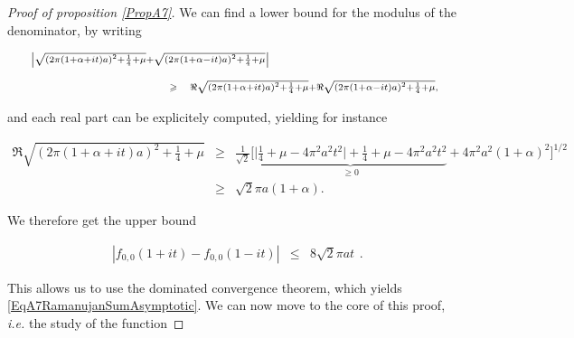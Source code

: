 \documentclass{jams-l}
\theoremstyle{definition}
\theoremstyle{remark}
\numberwithin{equation}{section}
\begin{document}
\begin{proof}[Proof of proposition \ref{PropA7}]
                \noindent We can find a lower bound for the modulus of the denominator, by writing
                
                \[ \begin{array}{lll}
                        \multicolumn{3}{l}{\scriptstyle \left \vert \sqrt{\left( 2 \pi \left( 1 + \alpha + it \right) a \right)^2 + \frac{1}{4} + \mu} + \sqrt{\left( 2 \pi \left( 1 + \alpha - it \right) a \right)^2 + \frac{1}{4} + \mu} \right \vert} \\[1em]
                        
                        \qquad \qquad \qquad \qquad \qquad & \scriptstyle \geqslant & \scriptstyle \Re \sqrt{\left( 2 \pi \left( 1 + \alpha + it \right) a \right)^2 + \frac{1}{4} + \mu} + \Re \sqrt{\left( 2 \pi \left( 1 + \alpha - it \right) a \right)^2 + \frac{1}{4} + \mu},
                    \end{array} \]
                
                \noindent and each real part can be explicitely computed, yielding for instance
                
                \[ \begin{array}{lll}
                        \scriptstyle \Re \sqrt{\left( 2 \pi \left( 1 + \alpha + it \right) a \right)^2 + \frac{1}{4} + \mu} & \scriptstyle \geqslant & \scriptstyle \frac{1}{\sqrt{2}} \big[ \underbrace{\big \vert \scriptstyle \frac{1}{4} + \mu - 4 \pi^2 a^2 t^2 \big \vert + \frac{1}{4} + \mu - 4 \pi^2 a^2 t^2}_{\geqslant 0} + 4 \pi^2 a^2 \left( 1 + \alpha \right)^2 \big]^{1/2} \\[1em]
                        
                        & \scriptstyle \geqslant & \scriptstyle \sqrt{2} \pi a \left( 1 + \alpha \right).
                    \end{array} \]
                
                \noindent We therefore get the upper bound
                
                \[ \begin{array}{lll}
                        \left \vert f_{0,0} \left( 1 + i t \right) - f_{0,0} \left( 1 - i t \right) \right \vert & \leqslant & 8 \sqrt{2} \pi a t
                    \end{array} . \]
                
                \noindent This allows us to use the dominated convergence theorem, which yields \eqref{EqA7RamanujanSumAsymptotic}. We can now move to the core of this proof, \textit{i.e.} the study of the function
                

\end{proof}
\end{document}
